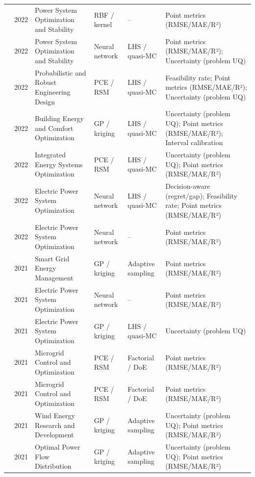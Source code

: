 \begin{longtable}{@{}p{} p{} p{} p{} p{} p{}@{}}
  \cite{Mahapatra2022721} & 2022 & Power System Optimization and Stability & RBF / kernel & -- & Point metrics (RMSE/MAE/R²) \\
  \cite{Su2022315} & 2022 & Power System Optimization and Stability & Neural network & LHS / quasi-MC & Point metrics (RMSE/MAE/R²); Uncertainty (problem UQ) \\
  \cite{Van Acker2022} & 2022 & Probabilistic and Robust Engineering Design & PCE / RSM & LHS / quasi-MC & Feasibility rate; Point metrics (RMSE/MAE/R²); Uncertainty (problem UQ) \\
  \cite{Volodina2022} & 2022 & Building Energy and Comfort Optimization & GP / kriging & LHS / quasi-MC & Uncertainty (problem UQ); Point metrics (RMSE/MAE/R²); Interval calibration \\
  \cite{Wang2022812} & 2022 & Integrated Energy Systems Optimization & PCE / RSM & LHS / quasi-MC & Uncertainty (problem UQ); Point metrics (RMSE/MAE/R²) \\
  \cite{Wu2022231} & 2022 & Electric Power System Optimization & Neural network & LHS / quasi-MC & Decision-aware (regret/gap); Feasibility rate; Point metrics (RMSE/MAE/R²) \\
  \cite{Xu20223066} & 2022 & Electric Power System Optimization & Neural network & -- & Point metrics (RMSE/MAE/R²) \\
  \cite{Gan2021695} & 2021 & Smart Grid Energy Management & GP / kriging & Adaptive sampling & Point metrics (RMSE/MAE/R²) \\
  \cite{Guo202115024} & 2021 & Electric Power System Optimization & Neural network & -- & Point metrics (RMSE/MAE/R²) \\
  \cite{Hu2021671} & 2021 & Electric Power System Optimization & GP / kriging & LHS / quasi-MC & Uncertainty (problem UQ) \\
  \cite{Hussien20211883} & 2021 & Microgrid Control and Optimization & PCE / RSM & Factorial / DoE & Point metrics (RMSE/MAE/R²) \\
  \cite{Hussien202190577} & 2021 & Microgrid Control and Optimization & PCE / RSM & Factorial / DoE & Point metrics (RMSE/MAE/R²) \\
  \cite{Kim2021} & 2021 & Wind Energy Research and Development & GP / kriging & Adaptive sampling & Uncertainty (problem UQ); Point metrics (RMSE/MAE/R²) \\
  \cite{Nematollahi2021} & 2021 & Optimal Power Flow Distribution & GP / kriging & Adaptive sampling & Uncertainty (problem UQ); Point metrics (RMSE/MAE/R²) \\

\end{longtable}
